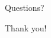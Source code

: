 \documentclass[aspectratio=169]{beamer}
\begin{document}
%
%


\begin{frame}
\begin{center}
Questions?
\vspace{1in}


\Huge{Thank you!}
\end{center}
\end{frame}
\end{document}

